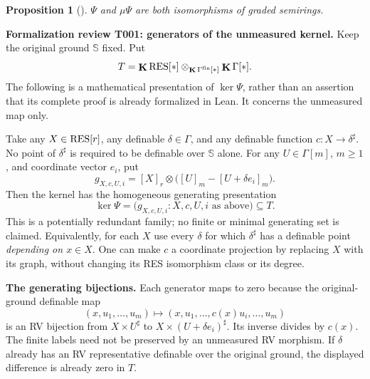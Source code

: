 \documentclass[12pt]{amsart}
\theoremstyle{plain}
\newtheorem{prop}[thm]{Proposition}
\theoremstyle{definition}
\theoremstyle{remark}
\numberwithin{equation}{section}
\theoremstyle{plain}
\newcommand{\0}{\emptyset}
\newcommand{\RES}{\textup{RES}}
\DeclareMathOperator{\ggk}{\mathbf{K}}
\DeclareMathOperator{\fin}{fin}
\begin{document}
\begin{prop}[{\cite[Corollary~10.3, Proposition~10.10(1)]{hrushovski:kazhdan:integration:vf}}]\label{red:D:iso}
$\Psi$ and ${\mu}\Psi$ are both isomorphisms of graded semirings.
\end{prop}

\begingroup\normalfont\small\color{blue}
\noindent\textbf{Formalization review T001: generators of the unmeasured kernel.}
Keep the original ground $\mathbb S$ fixed. Put
\[
 T=\ggk\RES[*]\otimes_{\ggk\Gamma^{\fin}[*]}\ggk\Gamma[*].
\]
The following is a mathematical presentation of $\ker\Psi$, rather than
an assertion that its complete proof is already formalized in Lean.
It concerns the unmeasured map only.

\smallskip
Take any $X\in\RES[r]$, any definable $\delta\in\Gamma$, and any
definable function $c:X\to\delta^\sharp$. No point of
$\delta^\sharp$ is required to be definable over $\mathbb S$ alone.
For any $U\in\Gamma[m]$, $m\geq1$, and coordinate vector $e_i$, put
\[
 g_{X,c,U,i}=[X]_r\otimes
       \bigl([U]_m-[U+\delta e_i]_m\bigr).
\]
Then the kernel has the homogeneous generating presentation
\[
 \boxed{\quad\ker\Psi=
   \bigl(g_{X,c,U,i}:X,c,U,i\text{ as above}\bigr)\subseteq T.\quad}
\]
This is a potentially redundant family; no finite or minimal generating
set is claimed. Equivalently, for each $X$ use every $\delta$ for which
$\delta^\sharp$ has a definable point \emph{depending on $x\in X$}.
One can make $c$ a coordinate projection by replacing $X$ with its graph,
without changing its RES isomorphism class or its degree.

\smallskip
\noindent\textbf{The generating bijections.}
Each generator maps to zero because the original-ground definable map
\[
 (x,u_1,\ldots,u_m)\longmapsto
 (x,u_1,\ldots,c(x)u_i,\ldots,u_m)
\]
is an RV bijection from $X\times U^\sharp$ to
$X\times(U+\delta e_i)^\sharp$. Its inverse divides by $c(x)$.
The finite labels need not be preserved by an unmeasured RV morphism.
If $\delta$ already has an RV representative definable over the original
ground, the displayed difference is already zero in $T$.
\end{document}
